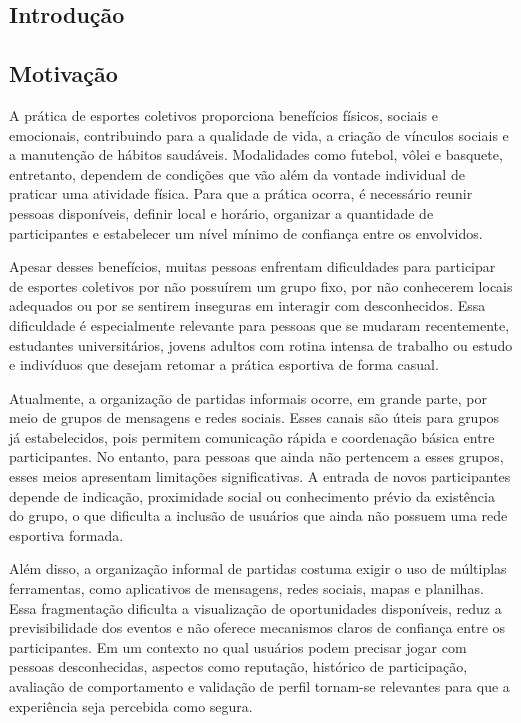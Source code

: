 \documentclass[a4paper, 12pt]{article}
\begin{document}
\clearpage

\begin{justify}
\setcounter{page}{1}

\section{Introdução}

\subsection{Motivação}

A prática de esportes coletivos proporciona benefícios físicos, sociais e emocionais, contribuindo para a qualidade de vida, a criação de vínculos sociais e a manutenção de hábitos saudáveis. Modalidades como futebol, vôlei e basquete, entretanto, dependem de condições que vão além da vontade individual de praticar uma atividade física. Para que a prática ocorra, é necessário reunir pessoas disponíveis, definir local e horário, organizar a quantidade de participantes e estabelecer um nível mínimo de confiança entre os envolvidos.

Apesar desses benefícios, muitas pessoas enfrentam dificuldades para participar de esportes coletivos por não possuírem um grupo fixo, por não conhecerem locais adequados ou por se sentirem inseguras em interagir com desconhecidos. Essa dificuldade é especialmente relevante para pessoas que se mudaram recentemente, estudantes universitários, jovens adultos com rotina intensa de trabalho ou estudo e indivíduos que desejam retomar a prática esportiva de forma casual.

Atualmente, a organização de partidas informais ocorre, em grande parte, por meio de grupos de mensagens e redes sociais. Esses canais são úteis para grupos já estabelecidos, pois permitem comunicação rápida e coordenação básica entre participantes. No entanto, para pessoas que ainda não pertencem a esses grupos, esses meios apresentam limitações significativas. A entrada de novos participantes depende de indicação, proximidade social ou conhecimento prévio da existência do grupo, o que dificulta a inclusão de usuários que ainda não possuem uma rede esportiva formada.

Além disso, a organização informal de partidas costuma exigir o uso de múltiplas ferramentas, como aplicativos de mensagens, redes sociais, mapas e planilhas. Essa fragmentação dificulta a visualização de oportunidades disponíveis, reduz a previsibilidade dos eventos e não oferece mecanismos claros de confiança entre os participantes. Em um contexto no qual usuários podem precisar jogar com pessoas desconhecidas, aspectos como reputação, histórico de participação, avaliação de comportamento e validação de perfil tornam-se relevantes para que a experiência seja percebida como segura.


\end{justify}
\end{document}
